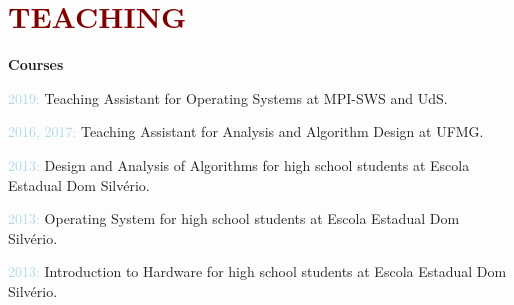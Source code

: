 \section*{\textcolor{maroon}{\normalsize TEACHING}} 

\textbf{Courses}

\begin{innerlist}[-]
    \item \textcolor{lightblue}{2019:} Teaching Assistant for Operating Systems at MPI-SWS and UdS.
    \item \textcolor{lightblue}{2016, 2017:} Teaching Assistant for Analysis and Algorithm Design at UFMG.
    \item \textcolor{lightblue}{2013:} Design and Analysis of Algorithms for high school students at Escola Estadual Dom Silvério.
    \item \textcolor{lightblue}{2013:} Operating System for high school students at Escola Estadual Dom Silvério.
    \item \textcolor{lightblue}{2013:} Introduction to Hardware for high school students at Escola Estadual Dom Silvério.

\end{innerlist}



